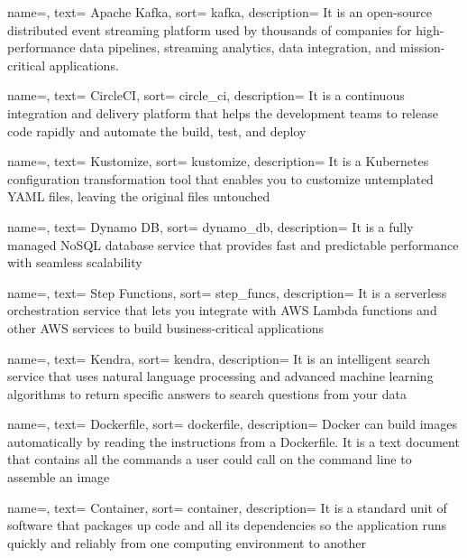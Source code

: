 {
  name=,
  text= Apache Kafka,
  sort= kafka,
  description= {It is an open-source distributed event streaming platform used by thousands of companies for high-performance data pipelines, streaming analytics, data integration, and mission-critical applications.}
}

{
  name=,
  text= CircleCI,
  sort= circle_ci,
  description= {It is a continuous integration and delivery platform that helps the development teams to release code rapidly and automate the build, test, and deploy}
}

{
  name=,
  text= Kustomize,
  sort= kustomize,
  description= {It is a Kubernetes configuration transformation tool that enables you to customize untemplated YAML files, leaving the original files untouched}
}

{
  name=,
  text= Dynamo DB,
  sort= dynamo_db,
  description= {It is a fully managed NoSQL database service that provides fast and predictable performance with seamless scalability}
}

{
  name=,
  text= Step Functions,
  sort= step_funcs,
  description= {It is a serverless orchestration service that lets you integrate with AWS Lambda functions and other AWS services to build business-critical applications}
}

{
  name=,
  text= Kendra,
  sort= kendra,
  description= {It is an intelligent search service that uses natural language processing and advanced machine learning algorithms to return specific answers to search questions from your data}
}

{
  name=,
  text= Dockerfile,
  sort= dockerfile,
  description= {Docker can build images automatically by reading the instructions from a Dockerfile. It is a text document that contains all the commands a user could call on the command line to assemble an image}
}

{
  name=,
  text= Container,
  sort= container,
  description= {It is a standard unit of software that packages up code and all its dependencies so the application runs quickly and reliably from one computing environment to another}
}

